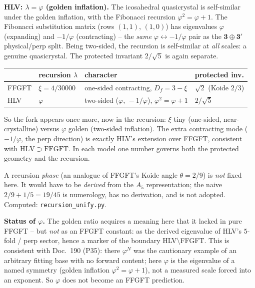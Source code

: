 \textbf{HLV: $\lambda=\varphi$ (golden inflation).} The icosahedral quasicrystal is
self-similar under the golden inflation, with the Fibonacci recursion $\varphi^2=\varphi+1$.
The Fibonacci substitution matrix (rows $(1,1)$, $(1,0)$) has eigenvalues $\varphi$
(expanding) and $-1/\varphi$ (contracting) -- the \emph{same} $\varphi\leftrightarrow-1/\varphi$
pair as the $\mathbf 3\oplus\mathbf 3'$ physical/perp split. Being two-sided, the recursion is
self-similar at \emph{all} scales: a genuine quasicrystal. The protected invariant $2/\sqrt5$
is again separate.

\begin{center}\small
\renewcommand{\arraystretch}{1.2}
\begin{tabular}{@{}p{2.0cm} p{2.7cm} p{5.0cm} p{2.6cm}@{}}
\toprule
 & recursion $\lambda$ & character & protected inv. \\
\midrule
FFGFT & $\xi=4/30000$ & one-sided contracting, $D_f=3-\xi$ & $\sqrt2$ (Koide $2/3$) \\
HLV & $\varphi$ & two-sided ($\varphi,\,-1/\varphi$), $\varphi^2=\varphi+1$ & $2/\sqrt5$ \\
\bottomrule
\end{tabular}
\end{center}

\noindent So the fork appears once more, now in the recursion: $\xi$ tiny (one-sided,
near-crystalline) versus $\varphi$ golden (two-sided inflation). The extra contracting mode
($-1/\varphi$, the perp direction) is exactly HLV's extension over FFGFT, consistent with
$\mathrm{HLV}\supset\mathrm{FFGFT}$. In each model one number governs both the protected
geometry and the recursion.

A recursion \emph{phase} (an analogue of FFGFT's Koide angle $\theta=2/9$) is \emph{not}
fixed here. It would have to be \emph{derived} from the $A_5$ representation; the naive
$2/9+1/5=19/45$ is numerology, has no derivation, and is not adopted. Computed:
\texttt{recursion\_unify.py}.

\medskip\noindent\textbf{Status of $\varphi$.} The golden ratio acquires a meaning here that it lacked in pure FFGFT -- but \emph{not} as an FFGFT constant: as the derived eigenvalue of HLV's $5$-fold / perp sector, hence a marker of the boundary HLV$\setminus$FFGFT. This is consistent with Doc.~190 (P35): there $\varphi^N$ was the cautionary example of an arbitrary fitting base with no forward content; here $\varphi$ is the eigenvalue of a named symmetry (golden inflation $\varphi^2=\varphi+1$), not a measured scale forced into an exponent. So $\varphi$ does not become an FFGFT prediction.

